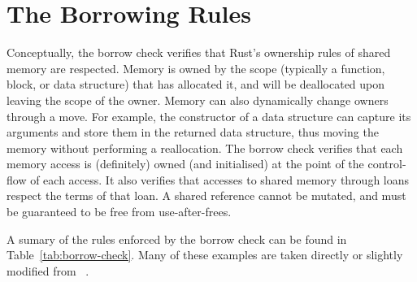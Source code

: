 \documentclass[11pt,a4paper,twoside,openany,draft]{report}
\begin{document}
\section{The Borrowing Rules}\label{sec:borrowing-rules}

Conceptually, the borrow check verifies that Rust's ownership rules of shared
memory are respected. Memory is owned by the scope (typically a function, block,
or data structure) that has allocated it, and will be deallocated upon leaving
the scope of the owner. Memory can also dynamically change owners through a
move. For example, the constructor of a data structure can capture its arguments
and store them in the returned data structure, thus moving the memory without
performing a reallocation. The borrow check verifies that each memory access is
(definitely) owned (and initialised) at the point of the control-flow of each
access. It also verifies that accesses to shared memory through loans respect
the terms of that loan. A shared reference cannot be mutated, and must be
guaranteed to be free from use-after-frees.

A sumary of the rules enforced by the borrow check can be found in
Table~\ref{tab:borrow-check}. Many of these examples are taken directly or
slightly modified from \citeauthor*{weiss_oxide:_2019}~\cite{weiss_oxide:_2019}.
\end{document}
